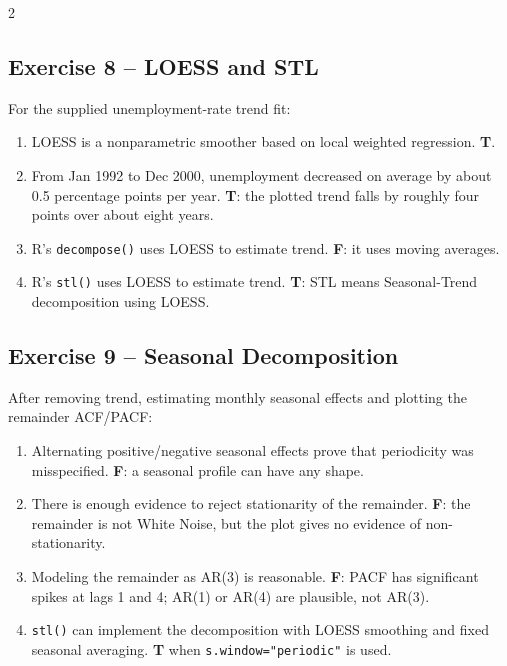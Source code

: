 \documentclass[9pt,a4paper]{extarticle}
\begin{document}
\begin{multicols}{2}
\subsection*{Exercise 8 -- LOESS and STL}
For the supplied unemployment-rate trend fit:
\begin{enumerate}[label=\alph*),leftmargin=4mm]
\item LOESS is a nonparametric smoother based on local weighted regression. \textbf{T}.
\item From Jan 1992 to Dec 2000, unemployment decreased on average by about 0.5 percentage points per year. \textbf{T}: the plotted trend falls by roughly four points over about eight years.
\item R's \texttt{decompose()} uses LOESS to estimate trend. \textbf{F}: it uses moving averages.
\item R's \texttt{stl()} uses LOESS to estimate trend. \textbf{T}: STL means Seasonal-Trend decomposition using LOESS.
\end{enumerate}

\subsection*{Exercise 9 -- Seasonal Decomposition}
After removing trend, estimating monthly seasonal effects and plotting the remainder ACF/PACF:
\begin{enumerate}[label=\alph*),leftmargin=4mm]
\item Alternating positive/negative seasonal effects prove that periodicity was misspecified. \textbf{F}: a seasonal profile can have any shape.
\item There is enough evidence to reject stationarity of the remainder. \textbf{F}: the remainder is not White Noise, but the plot gives no evidence of non-stationarity.
\item Modeling the remainder as AR(3) is reasonable. \textbf{F}: PACF has significant spikes at lags 1 and 4; AR(1) or AR(4) are plausible, not AR(3).
\item \texttt{stl()} can implement the decomposition with LOESS smoothing and fixed seasonal averaging. \textbf{T} when \texttt{s.window="periodic"} is used.
\end{enumerate}


\end{multicols}
\end{document}
